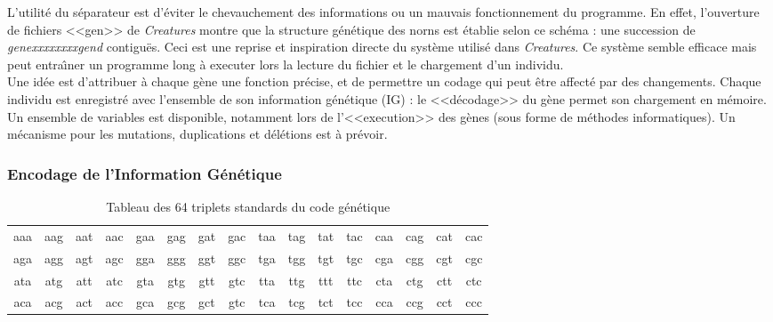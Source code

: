 \documentclass[11pt,twoside,a4paper]{article}
\begin{document}
L'utilit{\'e} du s{\'e}parateur est d'{\'e}viter le chevauchement des informations ou un mauvais fonctionnement du programme. En effet, l'ouverture de fichiers <<gen>> de \textit{Creatures} montre que la structure g{\'e}n{\'e}tique des norns est {\'e}tablie selon ce sch{\'e}ma : une succession de \emph{genexxxxxxxxgend} contigu{\" e}s. Ceci est une reprise et inspiration directe du syst{\`e}me utilis{\'e} dans \textit{Creatures}. Ce syst{\`e}me semble efficace mais peut entra{\^\i}ner un programme long {\`a} executer lors la lecture du fichier et le chargement d'un individu.~\\

Une id{\'e}e est d'attribuer {\`a} chaque g{\`e}ne une fonction pr{\'e}cise, et de permettre un codage qui peut {\^e}tre affect{\'e} par des changements. Chaque individu est enregistr{\'e} avec l'ensemble de son information g{\'e}n{\'e}tique (IG) : le <<d{\'e}codage>> du g{\`e}ne permet son chargement en m{\'e}moire.  Un ensemble de variables est disponible, notamment lors de l'<<execution>> des g{\`e}nes (sous forme de m{\'e}thodes informatiques). Un m{\'e}canisme pour les mutations, duplications et d{\'e}l{\'e}tions est {\`a} pr{\'e}voir.~\\


\subsubsection{Encodage de l'Information G{\'e}n{\'e}tique}

\begin{table}[ht]
	\begin{center}
		\begin{tabular}{|c c c c c c c c c c c c c c c c|}
		\hline
			aaa&aag&aat&aac&gaa&gag&gat&gac&taa&tag&tat&tac&caa&cag&cat&cac\\
			aga&agg&agt&agc&gga&ggg&ggt&ggc&tga&tgg&tgt&tgc&cga&cgg&cgt&cgc\\
			ata&atg&att&atc&gta&gtg&gtt&gtc&tta&ttg&ttt&ttc&cta&ctg&ctt&ctc\\
			aca&acg&act&acc&gca&gcg&gct&gtc&tca&tcg&tct&tcc&cca&ccg&cct&ccc\\
		\hline
		\end{tabular}
	\end{center}
	\caption{Tableau des 64 triplets standards du code g{\'e}n{\'e}tique}
	\label{tab:InformationGenetiqueStandardTriplets}
\end{table}
\end{document}
